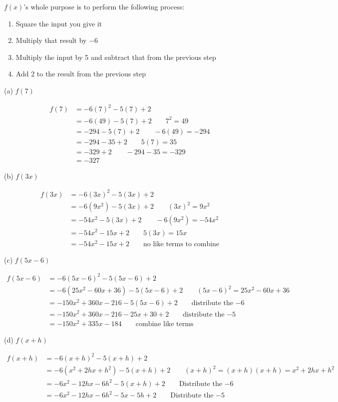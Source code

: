 \begin{solution}
$f(x)$'s whole purpose is to perform the following process:

\begin{enumerate}
    \item Square the input you give it
    \item Multiply that result by $-6$
    \item Multiply the input by 5 and subtract that from the previous step
    \item Add 2 to the result from the previous step
\end{enumerate}

(a)  $f(7)$

\begin{align*}
    f(7) &= -6(7)^2 - 5(7) + 2 \\
    &= -6(49) - 5(7) + 2 \qquad 7^2 = 49 \\
    &= -294 - 5(7) + 2 \qquad -6(49) = -294 \\
    &= -294 - 35 + 2 \qquad 5(7) = 35 \\
    &= -329 + 2 \qquad -294-35 = -329 \\
    &= -327
\end{align*}

(b)  $f(3x)$

\begin{align*}
    f(3x) &= -6(3x)^2 - 5(3x) + 2 \\
    &= -6(9x^2) - 5(3x) + 2 \qquad (3x)^2 = 9x^2 \\
    &= -54x^2 - 5(3x) + 2 \qquad -6(9x^2) = -54x^2 \\
    &= -54x^2 - 15x + 2 \qquad 5(3x) = 15x \\
    &= -54x^2 - 15x + 2 \qquad \text{no like terms to combine} 
\end{align*}

(c)  $f(5x-6)$

\begin{align*}
    f(5x-6) &= -6(5x-6)^2 - 5(5x-6) + 2 \\ 
    &= -6(25x^2 - 60x + 36) - 5(5x-6) + 2 \qquad (5x-6)^2 = 25x^2 - 60x + 36 \\
    &= -150x^2 + 360x - 216 - 5(5x-6) + 2 \qquad \text{distribute the $-6$} \\
    &= -150x^2 + 360x - 216 - 25x + 30 + 2 \qquad \text{distribute the $-5$} \\
    &= -150x^2 + 335x - 184 \qquad \text{combine like terms}
\end{align*}

(d) $f(x+h)$

\begin{align*}
  f(x+h) &= -6(x+h)^2 - 5(x+h) + 2 \\
  &= -6(x^2 + 2hx + h^2) - 5(x+h) + 2 \qquad (x+h)^2 = (x+h)(x+h) = x^2 + 2hx + h^2 \\
  &= -6x^2 - 12hx - 6h^2 - 5(x+h) + 2 \qquad \text{Distribute the $-6$} \\
  &= -6x^2 - 12hx - 6h^2 - 5x - 5h + 2 \qquad \text{Distribute the $-5$}
\end{align*}
\end{solution}

